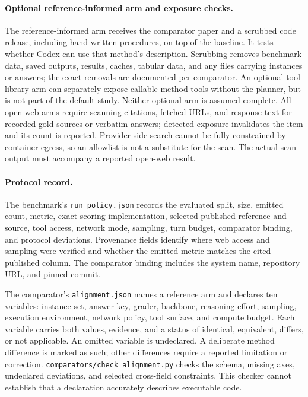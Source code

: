 \paragraph{Optional reference-informed arm and exposure checks.}
The reference-informed arm receives the comparator paper and a scrubbed code release, including
hand-written procedures, on top of the baseline. It tests whether Codex can use that method's
description. Scrubbing removes benchmark data, saved outputs, results, caches, tabular data,
and any files carrying instances or answers; the exact removals are documented per comparator.
An optional tool-library arm can separately expose callable method tools without the planner,
but is not part of the default study. Neither optional arm is assumed complete.
All open-web arms require scanning citations, fetched URLs, and response text for recorded gold
sources or verbatim answers; detected exposure invalidates the item and its count is reported.
Provider-side search cannot be fully constrained by container egress, so an allowlist is not a
substitute for the scan. The actual scan output must accompany a reported open-web result.

\paragraph{Protocol record.}
The benchmark's \texttt{run\_policy.json} records the evaluated split, size, emitted count,
metric, exact scoring implementation, selected published reference and source, tool access,
network mode, sampling, turn budget, comparator binding, and protocol deviations. Provenance
fields identify where web access and sampling were verified and whether the emitted metric
matches the cited published column. The comparator binding includes the system name,
repository URL, and pinned commit.

The comparator's \texttt{alignment.json} names a reference arm and declares ten variables:
instance set, answer key, grader, backbone, reasoning effort, sampling, execution environment,
network policy, tool surface, and compute budget. Each variable carries both values, evidence,
and a status of identical, equivalent, differs, or not applicable. An omitted variable is
undeclared. A deliberate method difference is marked as such; other differences require a
reported limitation or correction. \texttt{comparators/check\_alignment.py} checks the schema,
missing axes, undeclared deviations, and selected cross-field constraints. This checker cannot
establish that a declaration accurately describes executable code.

